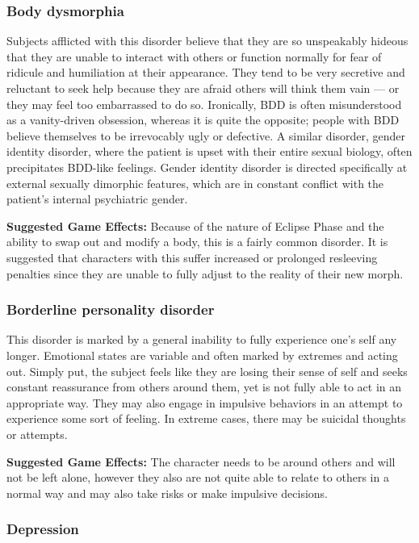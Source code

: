 \subsubsection{Body dysmorphia}

Subjects afflicted with this disorder believe that they are so unspeakably hideous that they are unable to interact with others or function normally for fear of ridicule and humiliation at their appearance. They tend to be very secretive and reluctant to seek help because they are afraid others will think them vain ---  or they may feel too embarrassed to do so. Ironically, BDD is often misunderstood as a vanity-driven obsession, whereas it is quite the opposite; people with BDD believe themselves to be irrevocably ugly or defective. A similar disorder, gender identity disorder, where the patient is upset with their entire sexual biology, often precipitates BDD-like feelings. Gender identity disorder is directed specifically at external sexually dimorphic features, which are in constant conflict with the patient’s internal psychiatric gender.

\textbf{Suggested Game Effects:} Because of the nature of Eclipse Phase and the ability to swap out and modify a body, this is a fairly common disorder. It is suggested that characters with this suffer increased or prolonged resleeving penalties since they are unable to fully adjust to the reality of their new morph.

\subsubsection{Borderline personality disorder}

This disorder is marked by a general inability to fully experience one’s self any longer. Emotional states are variable and often marked by extremes and acting out. Simply put, the subject feels like they are losing their sense of self and seeks constant reassurance from others around them, yet is not fully able to act in an appropriate way. They may also engage in impulsive behaviors in an attempt to experience some sort of feeling. In extreme cases, there may be suicidal thoughts or attempts.

\textbf{Suggested Game Effects:} The character needs to be around others and will not be left alone, however they also are not quite able to relate to others in a normal way and may also take risks or make impulsive decisions.

\subsubsection{Depression}

